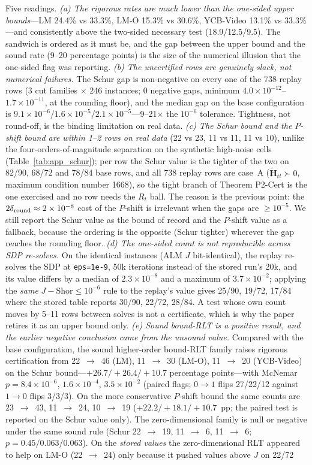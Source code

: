Five readings. \emph{(a) The rigorous rates are much lower than the one-sided upper bounds}---LM 24.4\% vs 33.3\%, LM-O 15.3\% vs 30.6\%, YCB-Video 13.1\% vs 33.3\%---and consistently above the two-sided necessary test (18.9/12.5/9.5). The sandwich is ordered as it must be, and the gap between the upper bound and the sound rate (9--20 percentage points) is the size of the numerical illusion that the one-sided flag was reporting. \emph{(b) The uncertified rows are genuinely slack, not numerical failures.} The Schur gap is non-negative on every one of the 738 replay rows (3 cut families $\times$ 246 instances; 0 negative gaps, minimum $4.0\times10^{-12}$--$1.7\times10^{-11}$, at the rounding floor), and the median gap on the base configuration is $9.1\times10^{-6}$/$1.6\times10^{-5}$/$2.1\times10^{-5}$---9--21$\times$ the $10^{-6}$ tolerance. Tightness, not round-off, is the binding limitation on real data. \emph{(c) The Schur bound and the $P$-shift bound are within 1--2 rows on real data} (22 vs 23, 11 vs 11, 11 vs 10), unlike the four-orders-of-magnitude separation on the synthetic high-noise cells (Table~\ref{tab:app_schur}); per row the Schur value is the tighter of the two on 82/90, 68/72 and 78/84 base rows, and all 738 replay rows are case~A ($\tilde{\mathbf H}_{tt}\succ0$, maximum condition number 1668), so the tight branch of Theorem P2-Cert is the one exercised and no row needs the $R_t$ ball. The reason is the previous point: the $2\delta_{\rm round}\approx2\times10^{-8}$ cost of the $P$-shift is irrelevant when the gaps are $\ge10^{-5}$. We still report the Schur value as the bound of record and the $P$-shift value as a fallback, because the ordering is the opposite (Schur tighter) wherever the gap reaches the rounding floor. \emph{(d) The one-sided count is not reproducible across SDP re-solves.} On the identical instances (ALM $J$ bit-identical), the replay re-solves the SDP at \texttt{eps=1e-9}, 50k iterations instead of the stored run's 20k, and its value differs by a median of $2.3\times10^{-8}$ and a maximum of $3.7\times10^{-2}$; applying the \emph{same} $J-\mathrm{Shor}\le10^{-6}$ rule to the replay's value gives 25/90, 19/72, 17/84 where the stored table reports 30/90, 22/72, 28/84. A test whose own count moves by 5--11 rows between solves is not a certificate, which is why the paper retires it as an upper bound only. \emph{(e) Sound bound-RLT is a positive result, and the earlier negative conclusion came from the unsound value.} Compared with the base configuration, the sound higher-order bound-RLT family raises rigorous certification from 22~$\to$~46 (LM), 11~$\to$~30 (LM-O), 11~$\to$~20 (YCB-Video) on the Schur bound---$+26.7/+26.4/+10.7$ percentage points---with McNemar $p=8.4\times10^{-6}$, $1.6\times10^{-4}$, $3.5\times10^{-2}$ (paired flags; $0\to1$ flips 27/22/12 against $1\to0$ flips 3/3/3). On the more conservative $P$-shift bound the same counts are 23~$\to$~43, 11~$\to$~24, 10~$\to$~19 ($+22.2/+18.1/+10.7$~pp; the paired test is reported on the Schur value only). The zero-dimensional family is null or negative under the same sound rule (Schur 22~$\to$~19, 11~$\to$~6, 11~$\to$~6; $p=0.45/0.063/0.063$). On the \emph{stored values} the zero-dimensional RLT appeared to help on LM-O (22~$\to$~24) only because it pushed values above $J$ on 22/72 